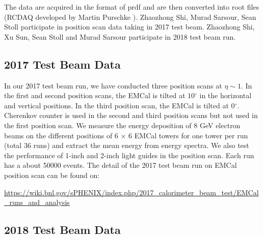 \documentclass[hidelinks,11pt]{article}
\numberwithin{figure}{section}
\numberwithin{table}{section}
\newcommand{\degree}{\mbox{$^\circ$}\xspace}
\begin{document}
The data are acquired in the format of prdf and are then converted into root files (RCDAQ developed by Martin Purschke \cite{RCDAQ}). Zhaozhong Shi, Murad Sarsour, Sean Stoll participate in position scan data taking in 2017 test beam. Zhaozhong Shi, Xu Sun, Sean Stoll and Murad Sarsour participate in 2018 test beam run. 

\subsection{2017 Test Beam Data}

In our 2017 test beam run, we have conducted three position scans at $\eta \sim 1$. In the first and second position scans, the EMCal is tilted at $10 \degree$ in the horizontal and vertical positions. In the third position scan, the EMCal is tilted at $0 \degree$. Cherenkov counter is used in the second and third position scans but not used in the first position scan. We measure the energy deposition of 8 GeV electron beams on the different positions of 6 $\times$ 6 EMCal towers for one tower per run (total 36 runs) and extract the mean energy from energy spectra. We also test the performance of 1-inch and 2-inch light guides in the position scan. Each run has a about 50000 events. The detail of the 2017 test beam run on EMCal position scan can be found on: 

\url{https://wiki.bnl.gov/sPHENIX/index.php/2017_calorimeter_beam_test/EMCal_runs_and_analysis}


\subsection{2018 Test Beam Data}
\end{document}
